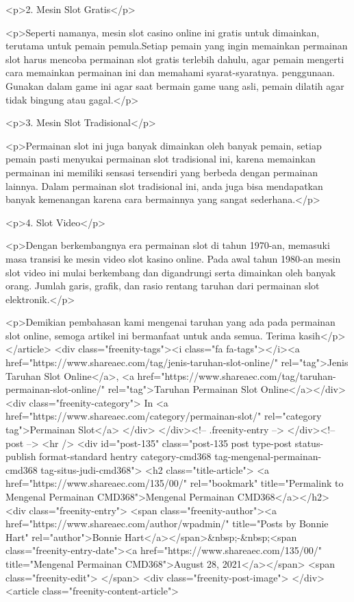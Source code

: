 <p>2. Mesin Slot Gratis</p>



<p>Seperti namanya, mesin slot casino online ini gratis untuk dimainkan, terutama untuk pemain pemula.Setiap pemain yang ingin memainkan permainan slot harus mencoba permainan slot gratis terlebih dahulu, agar pemain mengerti cara memainkan permainan ini dan memahami syarat-syaratnya. penggunaan. Gunakan dalam game ini agar saat bermain game uang asli, pemain dilatih agar tidak bingung atau gagal.</p>



<p>3. Mesin Slot Tradisional</p>



<p>Permainan slot ini juga banyak dimainkan oleh banyak pemain, setiap pemain pasti menyukai permainan slot tradisional ini, karena memainkan permainan ini memiliki sensasi tersendiri yang berbeda dengan permainan lainnya. Dalam permainan slot tradisional ini, anda juga bisa mendapatkan banyak kemenangan karena cara bermainnya yang sangat sederhana.</p>



<p>4. Slot Video</p>



<p>Dengan berkembangnya era permainan slot di tahun 1970-an, memasuki masa transisi ke mesin video slot kasino online. Pada awal tahun 1980-an mesin slot video ini mulai berkembang dan digandrungi serta dimainkan oleh banyak orang. Jumlah garis, grafik, dan rasio rentang taruhan dari permainan slot elektronik.</p>



<p>Demikian pembahasan kami mengenai taruhan yang ada pada permainan slot online, semoga artikel ini bermanfaat untuk anda semua. Terima kasih</p>
									</article>
																			<div class="freenity-tags"><i class="fa fa-tags"></i><a href="https://www.shareaec.com/tag/jenis-taruhan-slot-online/" rel="tag">Jenis Taruhan Slot Online</a>, <a href="https://www.shareaec.com/tag/taruhan-permainan-slot-online/" rel="tag">Taruhan Permainan Slot Online</a></div>
																			<div class="freenity-category">
											In <a href="https://www.shareaec.com/category/permainan-slot/" rel="category tag">Permainan Slot</a>										</div>
																	</div><!-- .freenity-entry -->
							</div><!-- post -->
							<hr />
													<div id="post-135" class="post-135 post type-post status-publish format-standard hentry category-cmd368 tag-mengenal-permainan-cmd368 tag-situs-judi-cmd368">
								<h2 class="title-article">
									<a href="https://www.shareaec.com/135/00/" rel="bookmark" title="Permalink to Mengenal Permainan CMD368">Mengenal Permainan CMD368</a></h2>
								<div class="freenity-entry">
									<span class="freenity-author"><a href="https://www.shareaec.com/author/wpadmin/" title="Posts by Bonnie Hart" rel="author">Bonnie Hart</a></span>&nbsp;-&nbsp;<span class="freenity-entry-date"><a href="https://www.shareaec.com/135/00/" title="Mengenal Permainan CMD368">August 28, 2021</a></span>
									<span class="freenity-edit"> </span>
									<div class="freenity-post-image">  </div>
																		<article class="freenity-content-article">
										
